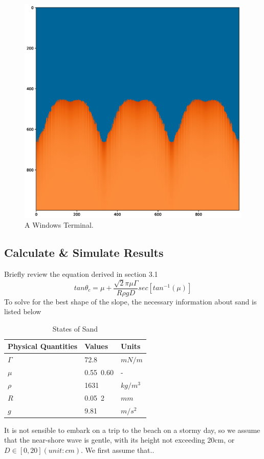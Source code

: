 \documentclass[12pt]{article}
\begin{document}
\begin{figure}[H]
    \includegraphics[width=\linewidth]{Figure_2.eps}
    \caption{A Windows Terminal.}
    \label{fig:Terminal}
\end{figure}

\subsection{Calculate \& Simulate Results}
Briefly review the equation derived in section 3.1
$$tan\theta_c = \mu + \frac{\sqrt{2}\pi\mu\Gamma}{R\rho gD}sec[tan^{-1}(\mu)]$$
To solve for the best shape of the slope, the necessary information about sand is listed below
\begin{table}[H]
    \caption{States of Sand}
    \vspace{10pt}
    \centering
    \begin{tabular}{p{4cm}p{2cm}p{2cm}}
        \hline
        Physical Quantities & Values    & Units    \\
        \hline
        $\Gamma$            & 72.8      & $mN/m$   \\
        $\mu$               & 0.55~0.60 & -        \\
        $\rho$              & 1631      & $kg/m^3$ \\
        $R$                 & 0.05~2    & $mm$     \\
        $g$                 & 9.81      & $m/s^2$  \\
        \hline
    \end{tabular}
    \label{bs2}
\end{table}
\par
It is not sensible to embark on a trip to the beach on a stormy day, so we assume that the near-shore wave is gentle, with its height not exceeding 20cm, or $D \in [0, 20](unit:cm)$.
We first assume that..
\end{document}
